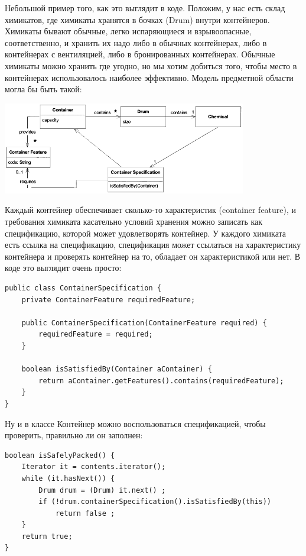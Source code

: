 \documentclass[a5paper]{article}
\begin{document}
Небольшой пример того, как это выглядит в коде. Положим, у нас есть склад химикатов, где химикаты хранятся в бочках (Drum) внутри контейнеров. Химикаты бывают обычные, легко испаряющиеся и взрывоопасные, соответственно, и хранить их надо либо в обычных контейнерах, либо в контейнерах с вентиляцией, либо в бронированных контейнерах. Обычные химикаты можно хранить где угодно, но мы хотим добиться того, чтобы место в контейнерах использовалось наиболее эффективно. Модель предметной области могла бы быть такой:

\begin{center}
    \includegraphics[width=0.8\textwidth]{chemicalsStructure.png}
\end{center}

Каждый контейнер обеспечивает сколько-то характеристик (container feature), и требования химиката касательно условий хранения можно записать как спецификацию, которой может удовлетворять контейнер. У каждого химиката есть ссылка на спецификацию, спецификация может ссылаться на характеристику контейнера и проверять контейнер на то, обладает он характеристикой или нет. В коде это выглядит очень просто:

\begin{verbatim}
public class ContainerSpecification {
    private ContainerFeature requiredFeature;

    public ContainerSpecification(ContainerFeature required) {
        requiredFeature = required;
    }

    boolean isSatisfiedBy(Container aContainer) {
        return aContainer.getFeatures().contains(requiredFeature);
    }
}
\end{verbatim}

Ну и в классе Контейнер можно воспользоваться спецификацией, чтобы проверить, правильно ли он заполнен:

\begin{verbatim}
boolean isSafelyPacked() {
    Iterator it = contents.iterator();
    while (it.hasNext()) {
        Drum drum = (Drum) it.next() ;
        if (!drum.containerSpecification().isSatisfiedBy(this))
            return false ;
    }
    return true;
}
\end{verbatim}
\end{document}
